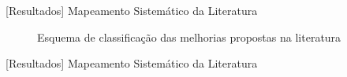 \documentclass[t,14pt,mathserif]{beamer}
\begin{document}
\begin{frame}{[Resultados] Mapeamento Sistemático da Literatura}

    \begin{figure}[tb] \centering
        \caption{Esquema de classificação das melhorias propostas na
            literatura}\label{fig:diagrama-esquema-dimensao-melhorias}
    \end{figure}
\end{frame}

\begin{frame}{[Resultados] Mapeamento Sistemático da Literatura}

    \begin{table}[htpb]
    \centering
    \caption{Total de artigos por papel na manutenção de software}
\label{tab:graf_papel_por_artigo}
    \end{table}

\end{frame}
\end{document}
